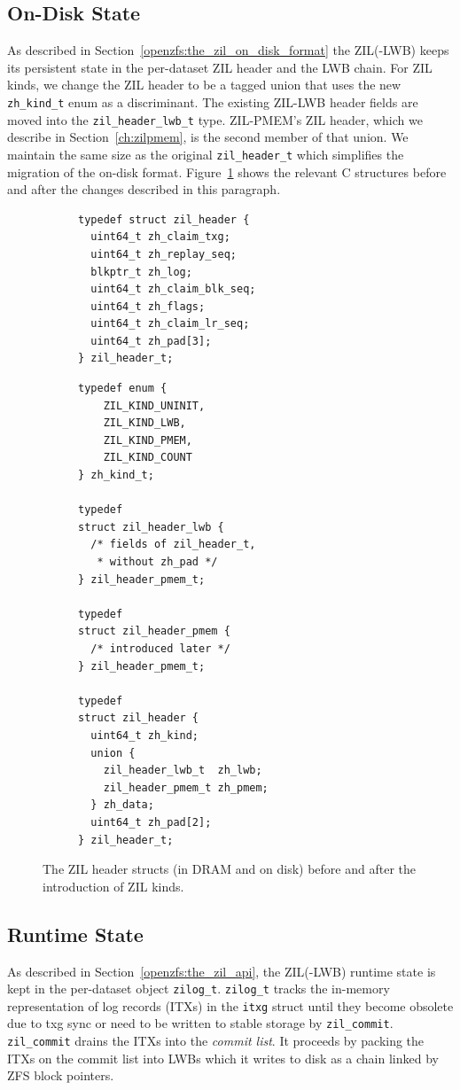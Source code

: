 \documentclass[12pt,a4paper,twoside]{book}
\begin{document}
\subsection{On-Disk State}\label{sec:di:zil_header}
As described in Section~\ref{openzfs:the_zil_on_disk_format} the ZIL(-LWB) keeps its persistent state in the per-dataset ZIL header and the LWB chain.
For ZIL kinds, we change the ZIL header to be a tagged union that uses the new \lstinline{zh_kind_t} enum as a discriminant.
The existing ZIL-LWB header fields are moved into the \lstinline{zil_header_lwb_t} type.
ZIL-PMEM's ZIL header, which we describe in Section~\ref{ch:zilpmem}, is the second member of that union.
We maintain the same size as the original \lstinline{zil_header_t} which simplifies the migration of the on-disk format.
Figure~\ref{lst:zil_header_before_and_after} shows the relevant C structures before and after the changes described in this paragraph.

\begin{figure}[h]
\begin{subfigure}[t]{0.45\textwidth}
\begin{lstlisting}
typedef struct zil_header {
  uint64_t zh_claim_txg;
  uint64_t zh_replay_seq;
  blkptr_t zh_log;
  uint64_t zh_claim_blk_seq;
  uint64_t zh_flags;
  uint64_t zh_claim_lr_seq;
  uint64_t zh_pad[3];
} zil_header_t;
\end{lstlisting}
\end{subfigure}
\hfill
\begin{subfigure}[t]{0.5\textwidth}
\begin{lstlisting}
typedef enum {
    ZIL_KIND_UNINIT,
    ZIL_KIND_LWB,
    ZIL_KIND_PMEM,
    ZIL_KIND_COUNT
} zh_kind_t;

typedef
struct zil_header_lwb {
  /* fields of zil_header_t,
   * without zh_pad */
} zil_header_pmem_t;

typedef
struct zil_header_pmem {
  /* introduced later */
} zil_header_pmem_t;

typedef
struct zil_header {
  uint64_t zh_kind;
  union {
    zil_header_lwb_t  zh_lwb;
    zil_header_pmem_t zh_pmem;
  } zh_data;
  uint64_t zh_pad[2];
} zil_header_t;
\end{lstlisting}
\end{subfigure}
\caption{The ZIL header structs (in DRAM and on disk) before and after the introduction of ZIL kinds.}
\label{lst:zil_header_before_and_after}
\end{figure}

\subsection{Runtime State}\label{sec:zil_kinds:runtime}
As described in Section~\ref{openzfs:the_zil_api}, the ZIL(-LWB) runtime state is kept in the per-dataset object \lstinline{zilog_t}.
\lstinline{zilog_t} tracks the in-memory representation of log records (ITXs) in the \lstinline{itxg} struct until they become obsolete due to txg sync or need to be written to stable storage by \lstinline{zil_commit}.
\lstinline{zil_commit} drains the ITXs into the \textit{commit list}.
It proceeds by packing the ITXs on the commit list into LWBs which it writes to disk as a chain linked by ZFS block pointers.
\end{document}
